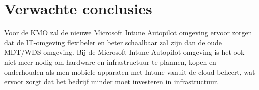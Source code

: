 \section{Verwachte conclusies}
\label{sec:verwachte_conclusies}

Voor de KMO zal de nieuwe Microsoft Intune Autopilot omgeving ervoor zorgen dat de IT-omgeving flexibeler en beter schaalbaar zal zijn dan de oude MDT/WDS-omgeving. Bij de Microsoft Intune Autopilot omgeving is het ook niet meer nodig om hardware en infrastructuur te plannen, kopen en onderhouden als men mobiele apparaten met Intune vanuit de cloud beheert, wat ervoor zorgt dat het bedrijf minder moet investeren in infrastructuur.


